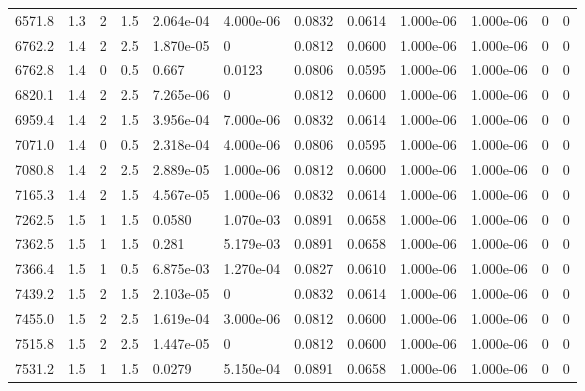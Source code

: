 \documentclass[preview]{standalone}
\begin{document}
{{{\begin{tabular}{L{1.2cm}C{1.2cm} C{0.3cm}C{0.5cm} C{1.4cm}C{1.4cm} C{1.4cm}C{1.4cm} C{1.6cm}C{1.6cm} C{1.6cm}C{1.6cm}}
  6571.8  &   1.3  & 2     & 1.5 &  2.064e-04  & 4.000e-06  &  0.0832&   0.0614& 1.000e-06 & 1.000e-06   &  0 & 0  \\ 
  6762.2  &   1.4  & 2     & 2.5 &  1.870e-05  & 0  &  0.0812&   0.0600& 1.000e-06 & 1.000e-06   &  0 & 0  \\ 
  6762.8  &   1.4  & 0     & 0.5 &  0.667  & 0.0123  &  0.0806&   0.0595& 1.000e-06 & 1.000e-06   &  0 & 0  \\ 
  6820.1  &   1.4  & 2     & 2.5 &  7.265e-06  & 0  &  0.0812&   0.0600& 1.000e-06 & 1.000e-06   &  0 & 0  \\ 
  6959.4  &   1.4  & 2     & 1.5 &  3.956e-04  & 7.000e-06  &  0.0832&   0.0614& 1.000e-06 & 1.000e-06   &  0 & 0  \\ 
  7071.0  &   1.4  & 0     & 0.5 &  2.318e-04  & 4.000e-06  &  0.0806&   0.0595& 1.000e-06 & 1.000e-06   &  0 & 0  \\ 
  7080.8  &   1.4  & 2     & 2.5 &  2.889e-05  & 1.000e-06  &  0.0812&   0.0600& 1.000e-06 & 1.000e-06   &  0 & 0  \\ 
  7165.3  &   1.4  & 2     & 1.5 &  4.567e-05  & 1.000e-06  &  0.0832&   0.0614& 1.000e-06 & 1.000e-06   &  0 & 0  \\ 
  7262.5  &   1.5  & 1     & 1.5 &  0.0580  & 1.070e-03  &  0.0891&   0.0658& 1.000e-06 & 1.000e-06   &  0 & 0  \\ 
  7362.5  &   1.5  & 1     & 1.5 &  0.281  & 5.179e-03  &  0.0891&   0.0658& 1.000e-06 & 1.000e-06   &  0 & 0  \\ 
  7366.4  &   1.5  & 1     & 0.5 &  6.875e-03  & 1.270e-04  &  0.0827&   0.0610& 1.000e-06 & 1.000e-06   &  0 & 0  \\ 
  7439.2  &   1.5  & 2     & 1.5 &  2.103e-05  & 0  &  0.0832&   0.0614& 1.000e-06 & 1.000e-06   &  0 & 0  \\ 
  7455.0  &   1.5  & 2     & 2.5 &  1.619e-04  & 3.000e-06  &  0.0812&   0.0600& 1.000e-06 & 1.000e-06   &  0 & 0  \\ 
  7515.8  &   1.5  & 2     & 2.5 &  1.447e-05  & 0  &  0.0812&   0.0600& 1.000e-06 & 1.000e-06   &  0 & 0  \\ 
  7531.2  &   1.5  & 1     & 1.5 &  0.0279  & 5.150e-04  &  0.0891&   0.0658& 1.000e-06 & 1.000e-06   &  0 & 0  \\ 
\hline 
\end{tabular} 

}}}
\end{document}
